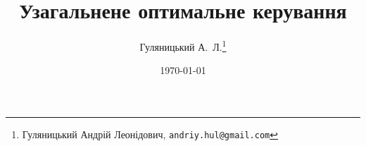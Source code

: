\documentclass[a4paper, 12pt]{article}
\numberwithin{equation}{subsection}
\begin{document}
\title{Узагальнене оптимальне керування}
\author{Гуляницький А.~Л.\footnote{Гуляницький Андрій Леонідович, \texttt{andriy.hul@gmail.com}}}
\date\today
\maketitle
\tableofcontents
\thispagestyle{empty}
\newpage









% 
% 
% 
\end{document}
